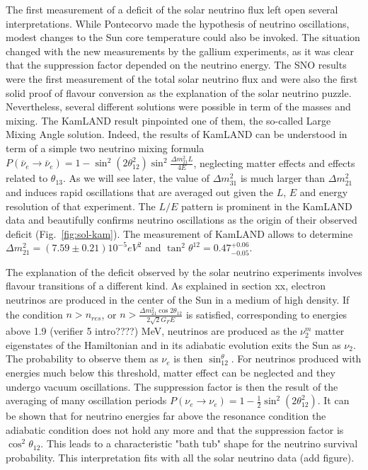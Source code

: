 The first measurement of a deficit of the solar neutrino flux left open several interpretations. While Pontecorvo made the hypothesis of neutrino oscillations, modest changes to the Sun core temperature could also be invoked. 
The situation changed with the new measurements by the gallium experiments, as it was clear that the suppression factor depended on the neutrino energy. The SNO results were the first measurement of the total solar neutrino flux and were also the first solid proof of flavour conversion as the explanation of the solar neutrino puzzle. 
Nevertheless, several different solutions were possible in term of the masses and mixing. The KamLAND result pinpointed one of them, the so-called Large Mixing Angle solution. Indeed, the results of KamLAND can be understood in term of a simple two neutrino mixing formula $ P(\bar{\nu}_e \rightarrow \bar{\nu}_e ) = 1 - \sin^2 (2 \theta_{12}^2) \sin^2 \frac{\Delta m^2_{21} L}{4 E} $, neglecting matter effects and effects related to $\theta_{13}$. As we will see later, the value of $\Delta m^2_{31}$ is much larger than $\Delta m^2_{21}$ and induces rapid oscillations that are averaged out given the $L$, $E$ and energy resolution of that experiment. The $L/E$ pattern is prominent in the KamLAND data and beautifully confirms neutrino oscillations as the origin of their observed deficit (Fig.~\ref{fig:sol-kam}). The measurement of KamLAND allows to determine $\Delta m^2_{21} = (7.59 \pm 0.21) 10^{-5}
eV^2$ and $\tan^2 \theta^{12} = 0.47 ^{+0.06} _{−0.05} $.

The explanation of the deficit observed by the solar neutrino experiments involves flavour transitions of a different kind. As explained in section xx, electron neutrinos are produced in the center of the Sun in a medium of high density. If the condition $n \gt n_{res}$, or $ n \gt \frac{\Delta m^2_{21} \cos 2 \theta_{12}}{ 2 \sqrt{2}G_F E}$ is satisfied, corresponding to energies above 1.9 (verifier 5 intro????) MeV, neutrinos are produced as the $ \nu^m_2$ matter eigenstates of the Hamiltonian and in its adiabatic evolution exits the Sun as $\nu_2$. The probability to observe them as $\nu_e$ is then $\sin^ \theta_{12}$. For neutrinos produced with energies much below this threshold, matter effect can be neglected and they undergo vacuum oscillations. The suppression factor is then the result of the averaging of many oscillation periods    
$ P({\nu}_e \rightarrow {\nu}_e ) = 1 - \frac{1}{2} \sin^2 (2 \theta_{12}^2)$. 
It can be shown that for neutrino energies far above the resonance condition the adiabatic condition does not hold any more and that the suppression factor is $\cos^2 \theta_{12} $. This leads to a characteristic "bath tub" shape for the neutrino survival probability. This interpretation fits with all the solar neutrino data (add figure). 













